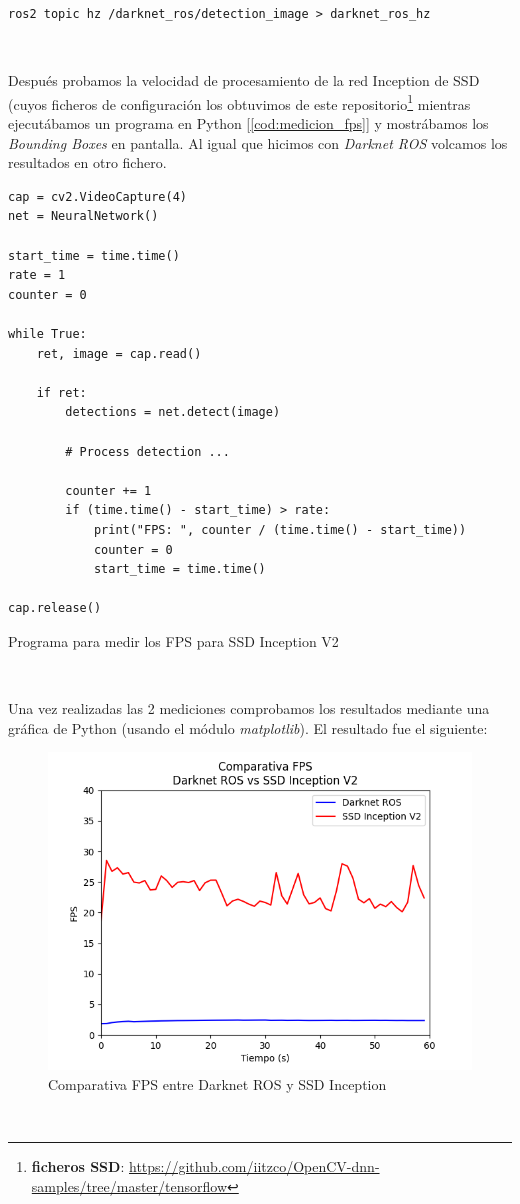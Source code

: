 \begin{lstlisting}
ros2 topic hz /darknet_ros/detection_image > darknet_ros_hz
\end{lstlisting}\

Después probamos la velocidad de procesamiento de la red Inception de SSD (cuyos ficheros de configuración los obtuvimos de este repositorio\footnote{\textbf{ficheros SSD}: \url{https://github.com/iitzco/OpenCV-dnn-samples/tree/master/tensorflow}} mientras ejecutábamos un programa en Python [\ref{cod:medicion_fps}] y mostrábamos los \textit{Bounding Boxes} en pantalla. Al igual que hicimos con \textit{Darknet ROS} volcamos los resultados en otro fichero.\\

\begin{code}[H]
\begin{lstlisting}
cap = cv2.VideoCapture(4)
net = NeuralNetwork()

start_time = time.time()
rate = 1
counter = 0

while True:
	ret, image = cap.read()
	
	if ret:
		detections = net.detect(image)
		
		# Process detection ...

		counter += 1
		if (time.time() - start_time) > rate:
			print("FPS: ", counter / (time.time() - start_time))
			counter = 0
			start_time = time.time()

cap.release()
\end{lstlisting}
\caption{Programa para medir los FPS para SSD Inception V2}
\label{cod:medicion_fps}
\end{code}\

Una vez realizadas las 2 mediciones comprobamos los resultados mediante una gráfica de Python (usando el módulo \textit{matplotlib}). El resultado fue el siguiente:

\begin{figure} [H]
  \begin{center}
    \includegraphics[width=12cm]{imagenes/cap5/comparativa-fps-models.png}
  \end{center}
  \caption[Comparativa FPS entre Darknet ROS y SSD Inception]{Comparativa FPS entre Darknet ROS y SSD Inception}
  \label{fig:comparativa_fps_models}
\end{figure}\

